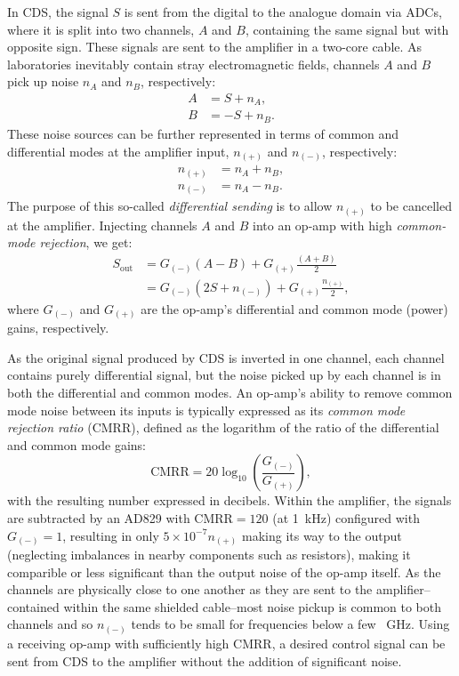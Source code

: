 In \gls{CDS}, the signal $S$ is sent from the digital to the analogue domain via \glspl{ADC}, where it is split into two channels, $A$ and $B$, containing the same signal but with opposite sign. These signals are sent to the amplifier in a two-core cable. As laboratories inevitably contain stray electromagnetic fields, channels $A$ and $B$ pick up noise $n_{A}$ and $n_{B}$, respectively:
\begin{align}
  A &= S + n_{A}, \\
  B &= -S + n_{B}.
\end{align}
These noise sources can be further represented in terms of common and differential modes at the amplifier input, $n_{\left(+\right)}$ and $n_{\left(-\right)}$, respectively:
\begin{align}
  n_{\left(+\right)} &= n_{A} + n_{B}, \\
  n_{\left(-\right)} &= n_{A} - n_{B}.
\end{align}
The purpose of this so-called \emph{differential sending} is to allow $n_{\left(+\right)}$ to be cancelled at the amplifier. Injecting channels $A$ and $B$ into an op-amp with high \emph{common-mode rejection}, we get:
\begin{align}
  S_{\text{out}} &= G_{\left(-\right)} \left(A - B\right) + G_{\left(+\right)} \frac{\left(A + B\right)}{2} \\
                 &= G_{\left(-\right)} \left(2S + n_{\left(-\right)}\right) + G_{\left(+\right)} \frac{n_{\left(+\right)}}{2},
\end{align}
where $G_{\left(-\right)}$ and $G_{\left(+\right)}$ are the op-amp's differential and common mode (power) gains, respectively.

As the original signal produced by \gls{CDS} is inverted in one channel, each channel contains purely differential signal, but the noise picked up by each channel is in both the differential and common modes. An op-amp's ability to remove common mode noise between its inputs is typically expressed as its \emph{common mode rejection ratio} (\gls{CMRR}), defined as the logarithm of the ratio of the differential and common mode gains:
\begin{equation}
  \text{CMRR} = 20 \log_{10} \left( \frac{G_{\left(-\right)}}{G_{\left(+\right)}} \right),
\end{equation}
with the resulting number expressed in decibels. Within the amplifier, the signals are subtracted by an AD829 with $\text{CMRR} = 120$ (at \SI{1}{\kilo\hertz}) configured with $G_{\left(-\right)} = 1$, resulting in only $5 \times 10^{-7} n_{\left(+\right)}$ making its way to the output (neglecting imbalances in nearby components such as resistors), making it comparible or less significant than the output noise of the op-amp itself. As the channels are physically close to one another as they are sent to the amplifier--contained within the same shielded cable--most noise pickup is common to both channels and so $n_{\left(-\right)}$ tends to be small for frequencies below a few \SI{}{\giga\hertz}. Using a receiving op-amp with sufficiently high \gls{CMRR}, a desired control signal can be sent from \gls{CDS} to the amplifier without the addition of significant noise.

